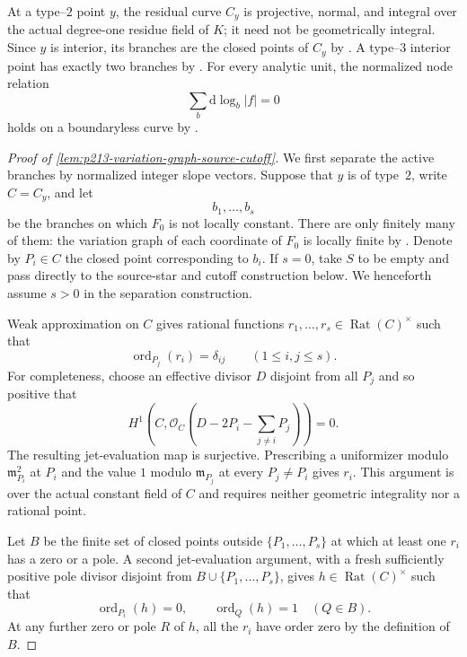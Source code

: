 At a type--$2$ point $y$, the residual curve $C_y$ is projective, normal,
and integral over the actual degree-one residue field of $K$; it need not
be geometrically integral.  Since $y$ is interior, its branches are the
closed points of $C_y$ by
\cite[Theorem~4.2.10 and \S4.2.11.1]{Ducros24CurveStructure}.  A type--$3$
interior point has exactly two branches by
\cite[\S4.2.11.2]{Ducros24CurveStructure}.  For every analytic unit, the
normalized node relation
\begin{equation}
                    \sum_{b}\mathrm d\log_b|f|=0
\label{eq:p213-normalized-node-relation}
\end{equation}
holds on a boundaryless curve by
\cite[Theorem~4.5.22]{Ducros24CurveStructure}.

\begin{proof}[Proof of
\cref{lem:p213-variation-graph-source-cutoff}]
We first separate the active branches by normalized integer slope vectors.
Suppose that $y$ is of type~$2$, write $C=C_y$, and let
\[
                     b_1,\ldots,b_s
\]
be the branches on which $F_0$ is not locally constant.  There are only
finitely many of them: the variation graph of each coordinate of $F_0$ is
locally finite by \cite[\S\S4.5.21.1--4.5.21.2]
{Ducros24CurveStructure}.  Denote by $P_i\in C$ the closed point
corresponding to $b_i$.  If $s=0$, take $S$ to be empty and pass directly
to the source-star and cutoff construction below.  We henceforth assume
$s>0$ in the separation construction.

Weak approximation on $C$ gives rational functions
$r_1,\ldots,r_s\in\operatorname{Rat}(C)^\times$ such that
\begin{equation}
       \operatorname{ord}_{P_j}(r_i)=\delta_{ij}
       \qquad(1\leq i,j\leq s).
\label{eq:p213-variation-first-order-block-revised}
\end{equation}
For completeness, choose an effective divisor $D$ disjoint from all
$P_j$ and so positive that
\[
 H^1\!\left(C,
   \mathcal O_C\!\left(D-2P_i-\sum_{j\ne i}P_j\right)\right)=0.
\]
The resulting jet-evaluation map is surjective.  Prescribing a
uniformizer modulo $\mathfrak m_{P_i}^2$ at $P_i$ and the value $1$
modulo $\mathfrak m_{P_j}$ at every $P_j\ne P_i$ gives $r_i$.
This argument is over the actual constant field of $C$ and requires
neither geometric integrality nor a rational point.

Let $B$ be the finite set of closed points outside
$\{P_1,\ldots,P_s\}$ at which at least one $r_i$ has a zero or a pole.
A second jet-evaluation argument, with a fresh sufficiently positive pole
divisor disjoint from $B\cup\{P_1,\ldots,P_s\}$, gives
$h\in\operatorname{Rat}(C)^\times$ such that
\begin{equation}
 \operatorname{ord}_{P_i}(h)=0,
 \qquad
 \operatorname{ord}_{Q}(h)=1\quad(Q\in B).
\label{eq:p213-variation-collision-killer-revised}
\end{equation}
At any further zero or pole $R$ of $h$, all the $r_i$ have order zero by
the definition of $B$.


\end{proof}
